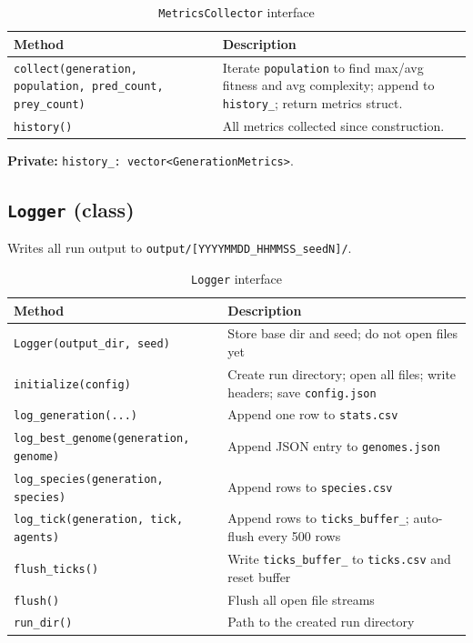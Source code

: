 \begin{table}[H]
\centering\small
\caption{\texttt{MetricsCollector} interface}
\begin{tabularx}{\textwidth}{@{}lX@{}}
\toprule
\textbf{Method} & \textbf{Description} \\
\midrule
\texttt{collect(generation, population, pred\_count, prey\_count)} &
  Iterate \texttt{population} to find max/avg fitness and avg complexity;
  append to \texttt{history\_}; return metrics struct. \\
\texttt{history()} &
  All metrics collected since construction. \\
\bottomrule
\end{tabularx}
\end{table}

\textbf{Private:} \texttt{history\_: vector<GenerationMetrics>}.

\subsection{\texttt{Logger} (class)}

Writes all run output to \texttt{output/[YYYYMMDD\_HHMMSS\_seedN]/}.

\begin{table}[H]
\centering\small
\caption{\texttt{Logger} interface}
\begin{tabularx}{\textwidth}{@{}lX@{}}
\toprule
\textbf{Method} & \textbf{Description} \\
\midrule
\texttt{Logger(output\_dir, seed)} & Store base dir and seed; do not open files yet \\
\texttt{initialize(config)} & Create run directory; open all files; write headers; save \texttt{config.json} \\
\texttt{log\_generation(...)} & Append one row to \texttt{stats.csv} \\
\texttt{log\_best\_genome(generation, genome)} & Append JSON entry to \texttt{genomes.json} \\
\texttt{log\_species(generation, species)} & Append rows to \texttt{species.csv} \\
\texttt{log\_tick(generation, tick, agents)} & Append rows to \texttt{ticks\_buffer\_}; auto-flush every 500 rows \\
\texttt{flush\_ticks()} & Write \texttt{ticks\_buffer\_} to \texttt{ticks.csv} and reset buffer \\
\texttt{flush()} & Flush all open file streams \\
\texttt{run\_dir()} & Path to the created run directory \\
\bottomrule
\end{tabularx}
\end{table}

